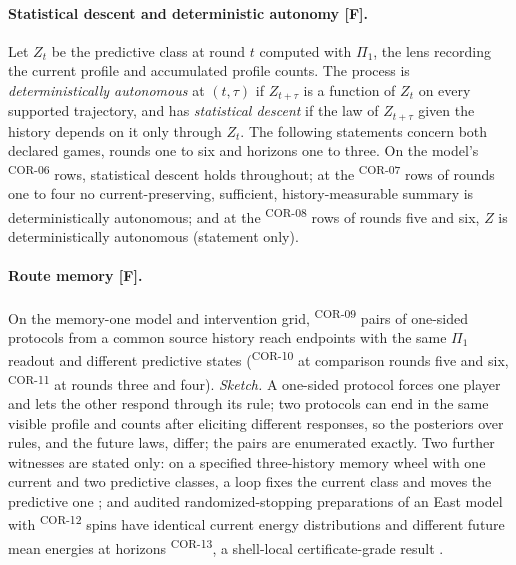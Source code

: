 \documentclass[pdflatex,sn-basic]{sn-jnl}%
\newcommand{\rec}[1]{\ifannotated\textsuperscript{\textcolor{blue!60!black}{\tiny#1}}\fi}
\begin{document}
\begin{appendices}
\paragraph{Statistical descent and deterministic autonomy [F].} Let $Z_t$ be the predictive class at round $t$ computed with $\Pi_1$, the lens recording the current profile and accumulated profile counts. The process is \emph{deterministically autonomous} at $(t,\tau)$ if $Z_{t+\tau}$ is a function of $Z_t$ on every supported trajectory, and has \emph{statistical descent} if the law of $Z_{t+\tau}$ given the history depends on it only through $Z_t$. The following statements concern both declared games, rounds one to six and horizons one to three. On the model's \numInstAllRows\rec{COR-06} rows, statistical descent holds throughout; at the \numInstFormationRows\rec{COR-07} rows of rounds one to four no current-preserving, sufficient, history-measurable summary is deterministically autonomous; and at the \numInstFormedRows\rec{COR-08} rows of rounds five and six, $Z$ is deterministically autonomous (statement only).

\paragraph{Route memory [F].} On the memory-one model and intervention grid, \numInstLoopPairs\rec{COR-09} pairs of one-sided protocols from a common source history reach endpoints with the same $\Pi_1$ readout and different predictive states (\numInstLoopPairsLate\rec{COR-10} at comparison rounds five and six, \numInstLoopPairsEarly\rec{COR-11} at rounds three and four). \emph{Sketch.} A one-sided protocol forces one player and lets the other respond through its rule; two protocols can end in the same visible profile and counts after eliciting different responses, so the posteriors over rules, and the future laws, differ; the pairs are enumerated exactly. Two further witnesses are stated only: on a specified three-history memory wheel with one current and two predictive classes, a loop fixes the current class and moves the predictive one \citep{tsiokos2026consciousness}; and audited randomized-stopping preparations of an East model with \numGlassSpins\rec{COR-12} spins have identical current energy distributions and different future mean energies at horizons \numGlassHorizons\rec{COR-13}, a shell-local certificate-grade result \citep{tsiokos2026glass}.


\end{appendices}
\end{document}
